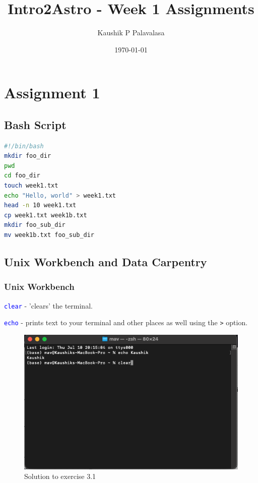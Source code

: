 \documentclass[floatfix, aps]{revtex4-2}
\begin{document}

\title{Intro2Astro - Week 1 Assignments}
\author{Kaushik P Palavalasa}
\date{\today}

\maketitle

\section{Assignment 1}

\subsection{Bash Script}
\begin{lstlisting}[language=bash]
#!/bin/bash
mkdir foo_dir 
pwd
cd foo_dir
touch week1.txt
echo "Hello, world" > week1.txt
head -n 10 week1.txt
cp week1.txt week1b.txt
mkdir foo_sub_dir
mv week1b.txt foo_sub_dir

\end{lstlisting}

\subsection{Unix Workbench and Data Carpentry}

\subsubsection{Unix Workbench}

\textcolor{blue}{\texttt{clear}} \tab - \tab 'clears' the terminal.

\textcolor{blue}{\texttt{echo}} \tab - \tab prints text to your terminal and other places as well using the \texttt{>} option.

\begin{figure}[H]
    \centering
    \includegraphics[width=0.75\linewidth]{Exercise 3.1 Unix Workbench.png}
    \caption{Solution to exercise 3.1}
    \label{fig:enter-label}
\end{figure}
\end{document}
